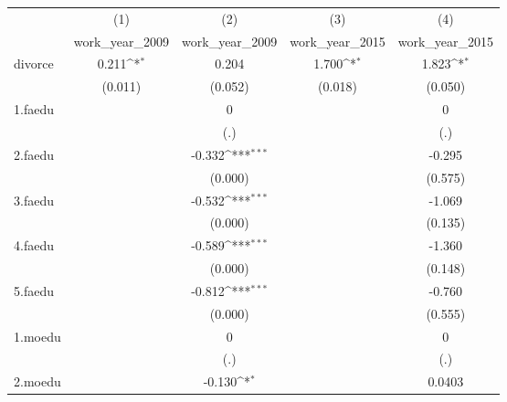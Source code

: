 {
\def\sym#1{\ifmmode^{#1}\else\(^{#1}\)\fi}
\begin{tabular}{l*{4}{c}}
\hline\hline
            &\multicolumn{1}{c}{(1)}&\multicolumn{1}{c}{(2)}&\multicolumn{1}{c}{(3)}&\multicolumn{1}{c}{(4)}\\
            &\multicolumn{1}{c}{work\_year\_2009}&\multicolumn{1}{c}{work\_year\_2009}&\multicolumn{1}{c}{work\_year\_2015}&\multicolumn{1}{c}{work\_year\_2015}\\
\hline
divorce     &       0.211\sym{*}  &       0.204         &       1.700\sym{*}  &       1.823\sym{*}  \\
            &     (0.011)         &     (0.052)         &     (0.018)         &     (0.050)         \\
[1em]
1.faedu     &                     &           0         &                     &           0         \\
            &                     &         (.)         &                     &         (.)         \\
[1em]
2.faedu     &                     &      -0.332\sym{***}&                     &      -0.295         \\
            &                     &     (0.000)         &                     &     (0.575)         \\
[1em]
3.faedu     &                     &      -0.532\sym{***}&                     &      -1.069         \\
            &                     &     (0.000)         &                     &     (0.135)         \\
[1em]
4.faedu     &                     &      -0.589\sym{***}&                     &      -1.360         \\
            &                     &     (0.000)         &                     &     (0.148)         \\
[1em]
5.faedu     &                     &      -0.812\sym{***}&                     &      -0.760         \\
            &                     &     (0.000)         &                     &     (0.555)         \\
[1em]
1.moedu     &                     &           0         &                     &           0         \\
            &                     &         (.)         &                     &         (.)         \\
[1em]
2.moedu     &                     &      -0.130\sym{*}  &                     &      0.0403         \\

\end{tabular}}
